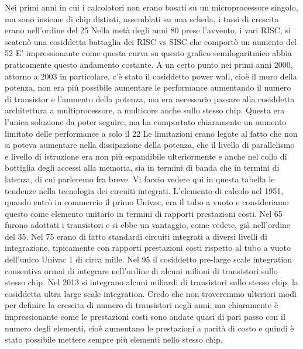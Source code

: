 Nei primi anni in cui i calcolatori non erano basati su un microprocessore singolo, ma sono insieme di chip distinti, assemblati su una scheda, i tassi di crescita erano nell'ordine del 25%
Nella metà degli anni 80 prese l'avvento, i vari RISC, si scatenò una cosiddetta battaglia dei RISC vs SISC che comportò un aumento del 52%
E' impressionante come questa curva su questo grafico semilogaritmico abbia praticamente questo andamento costante.
A un certo punto nei primi anni 2000, attorno a 2003 in particolare, c'è stato il cosiddetto power wall, cioè il muro della potenza, non era più possibile aumentare le performance aumentando il numero di transistor e l'aumento della potenza, ma era necessario passare alla cosiddetta architettura a multiprocessore, a multicore anche sullo stesso chip.
Questa era l'unica soluzione da poter seguire, ma ha comportato chiaramente un aumento limitato delle performance a solo il 22%
Le limitazioni erano legate al fatto che non si poteva aumentare nella dissipazione della potenza, che il livello di parallelismo e livello di istruzione era non più espandibile ulteriormente e anche nel collo di bottiglia degli accessi alla memoria, sia in termini di banda che in termini di latenza, di cui parleremo fra breve.
Vi faccio vedere qui in questa tabella le tendenze nella tecnologia dei circuiti integrati.
L'elemento di calcolo nel 1951, quando entrò in commercio il primo Univac, era il tubo a vuoto e consideriamo questo come elemento unitario in termini di rapporti prestazioni costi.
Nel 65 furono adottati i transistori e si ebbe un vantaggio, come vedete, già nell'ordine del 35.
Nel 75 erano di fatto standardi circuiti integrati a diversi livelli di integrazione, tipicamente con rapporti prestazioni costi rispetto al tubo a vuoto dell'unico Univac 1 di circa mille.
Nel 95 il cosiddetto pre-large scale integration consentiva ormai di integrare nell'ordine di alcuni milioni di transistori sullo stesso chip.
Nel 2013 si integrano alcuni miliardi di transistori sullo stesso chip, la cosiddetta ultra large scale integration.
Credo che non troveremmo ulteriori modi per definire la crescita di numero di transistori negli anni, ma chiaramente è impressionante come le prestazioni costi sono andate quasi di pari passo con il numero degli elementi, cioè aumentano le prestazioni a parità di costo e quindi è stato possibile mettere sempre più elementi nello stesso chip.
